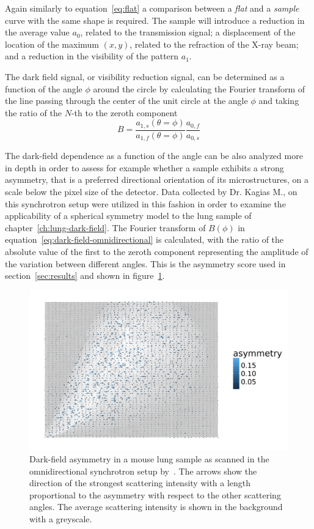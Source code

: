 Again similarly to equation~\ref{eq:flat} a comparison between a
\emph{flat} and a \emph{sample} curve with the same shape is required. The
sample will introduce a reduction in the average value $a_0$, related to the
transmission signal; a displacement of the location of the maximum $(x, y)$,
related to the refraction of the X-ray beam; and a reduction in the
visibility of the pattern $a_1$. 

The dark field signal, or visibility reduction signal, can be
determined as a function of the angle $\phi$ around the circle by
calculating the Fourier transform of the line passing through the center of
the unit circle at the angle $\phi$ and taking the ratio of the $N$-th to
the zeroth component
\begin{equation}
    B = \frac{a_{1,s}(\theta = \phi)}{a_{1,f}(\theta =
\phi)}\frac{a_{0,f}}{a_{0,s}}
    \label{eq:dark-field-omnidirectional}
\end{equation}

The dark-field dependence as a function of the angle can be also analyzed
more in depth in order to assess for example whether a sample exhibits a
strong asymmetry, that is a preferred directional orientation of its
microstructures, on a scale below the pixel size of the detector. Data
collected by Dr. Kagias M., on this synchrotron setup were utilized in this
fashion in order to examine the applicability of a spherical symmetry model
to the lung sample of chapter~\ref{ch:lung-dark-field}. The 
Fourier transform of $B(\phi)$ in
equation~\ref{eq:dark-field-omnidirectional} is calculated, with the ratio of
the absolute value of the first to the zeroth component representing the
amplitude of the variation between different angles. This is the asymmetry
score used in section~\ref{sec:results} and shown in
figure~\ref{fig:lung_omnidir_asym}.

\begin{figure}[ht]
    \centering
    \includegraphics[width=\textwidth]{gfx/lung_omnidir.png}
    \caption[Dark-field asymmetry for a mouse lung.]{Dark-field asymmetry in a mouse lung sample as scanned in the
        omnidirectional synchrotron setup by~\cite{PhysRevLett.116.093902}.
    The arrows show the direction of the strongest scattering intensity with
    a length proportional to the asymmetry with respect to the other
scattering angles. The average scattering intensity is shown in the
background with a greyscale.}
    \label{fig:lung_omnidir_asym}
\end{figure}

